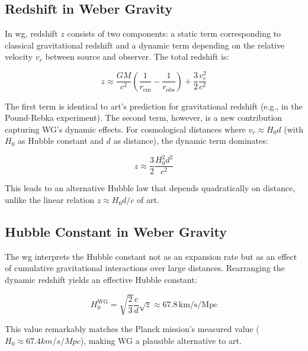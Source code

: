 \subsection{Redshift in Weber Gravity}
In \gls{wg}, redshift $z$ consists of two components: a static term corresponding to classical gravitational redshift and a
dynamic term depending on the relative velocity $v_r$ between source and observer. The total redshift is:

\begin{equation}
    z \approx \frac{GM}{c^2} \left( \frac{1}{r_{\text{em}}} - \frac{1}{r_{\text{obs}}} \right) + \frac{3}{2} \frac{v_r^2}{c^2}
\end{equation}

The first term is identical to \gls{art}'s prediction for gravitational redshift (e.g., in the Pound-Rebka experiment). The second term, however, is a new contribution
capturing WG's dynamic effects. For cosmological distances where $v_r \approx H_0 d$ (with $H_0$ as Hubble constant and $d$ as distance), the dynamic term dominates:

\begin{equation}
    z \approx \frac{3}{2} \frac{H_0^2 d^2}{c^2}
\end{equation}

This leads to an alternative Hubble law that depends quadratically on distance, unlike the linear relation $z \approx H_0 d / c$ of \gls{art}.

\subsection{Hubble Constant in Weber Gravity}
The \gls{wg} interprets the Hubble constant not as an expansion rate but as an effect of cumulative gravitational interactions over large distances. Rearranging
the dynamic redshift yields an effective Hubble constant:

\begin{equation}
    H_0^{\text{WG}} = \sqrt{\frac{2}{3}} \frac{c}{d} \sqrt{z} \approx 67.8 \, \text{km/s/Mpc}
\end{equation}

This value remarkably matches the Planck mission's measured value ($H_0 \approx 67.4 km/s/Mpc$), making WG a plausible alternative to \gls{art}.

